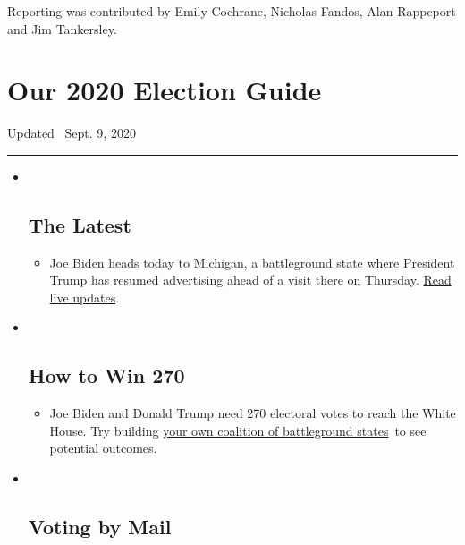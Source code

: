 Reporting was contributed by Emily Cochrane, Nicholas Fandos, Alan
Rappeport and Jim Tankersley.

\hypertarget{our-2020-election-guide}{%
\section{Our 2020 Election Guide}\label{our-2020-election-guide}}

Updated ~Sept. 9, 2020

\begin{center}\rule{0.5\linewidth}{\linethickness}\end{center}

\begin{itemize}
\item ~
  \hypertarget{the-latest}{%
  \subsection{The Latest}\label{the-latest}}

  \begin{itemize}
  \item
    Joe Biden heads today to Michigan, a battleground state where
    President Trump has resumed advertising ahead of a visit there on
    Thursday.
    \href{https://www.nytimes3xbfgragh.onion/live/2020/09/09/us/trump-vs-biden?action=click\&pgtype=Article\&state=default\&region=BELOW_MAIN_CONTENT\&context=storylines_guide}{Read
    live updates}.
  \end{itemize}
\item ~
  \hypertarget{how-to-win-270}{%
  \subsection{How to Win 270}\label{how-to-win-270}}

  \begin{itemize}
  \item
    Joe Biden and Donald Trump need 270 electoral votes to reach the
    White House. Try building
    \href{https://www.nytimes3xbfgragh.onion/interactive/2020/us/elections/election-states-biden-trump.html?action=click\&pgtype=Article\&state=default\&region=BELOW_MAIN_CONTENT\&context=storylines_guide}{your
    own coalition of battleground states}~to see potential outcomes.
  \end{itemize}
\item ~
  \hypertarget{voting-by-mail}{%
  \subsection{Voting by Mail}\label{voting-by-mail}}


\end{itemize}
